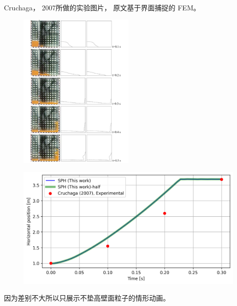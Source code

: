 \begin{frame}
    Cruchaga， 2007所做的实验图片，
    原文基于界面捕捉的 FEM。
    \begin{figure}[H]
        \centering
        \includegraphics[width=0.5\textwidth]{images/Cruchaga/cruchaga_experiment.png}
    \end{figure}
\end{frame}

\begin{frame}
    \begin{figure}[H]
        \centering
        \includegraphics[width=\textwidth]{images/Cruchaga/2d/cruchaga_2d.png}
    \end{figure}
    因为差别不大所以只展示不垫高壁面粒子的情形动画。
\end{frame}

